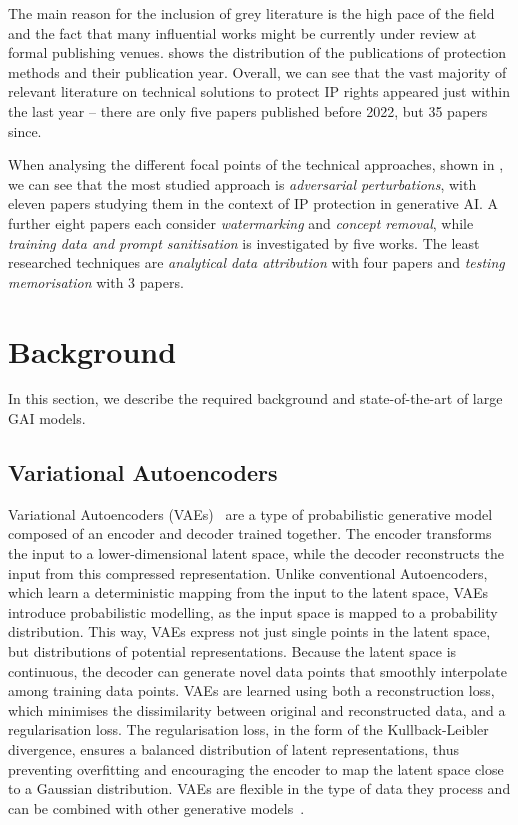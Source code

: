\documentclass[conference,table]{IEEEtran}
\begin{document}
The main reason for the inclusion of grey literature is the high pace of the field and the fact that many influential works might be currently under review at formal publishing venues.
 shows the distribution of the publications of protection methods and their publication year. 
Overall, we can see that the vast majority of relevant literature on technical solutions to protect IP rights appeared just within the last year -- there are only five papers published before 2022, but 35 papers since.

When analysing the different focal points of the technical approaches, shown in , we can see that the most studied approach is \textit{adversarial perturbations}, with eleven papers studying them in the context of IP protection in generative AI.
A further eight papers each consider \textit{watermarking} and \textit{concept removal}, while \textit{training data and prompt sanitisation} is investigated by five works.
The least researched techniques are \textit{analytical data attribution} with four papers and \textit{testing memorisation} with 3 papers.

\section{Background}\label{sec:background}
In this section, we describe the required background and state-of-the-art of large GAI models.

\subsection{Variational Autoencoders}
Variational Autoencoders (VAEs)~\cite{kingma_auto-encoding_2022} are a type of probabilistic generative model composed of an encoder and decoder trained together. The encoder transforms the input to a lower-dimensional latent space, while the decoder reconstructs the input from this compressed representation. Unlike conventional Autoencoders, which learn a deterministic mapping from the input to the latent space, VAEs introduce probabilistic modelling, as the input space is mapped to a probability distribution. This way, VAEs express not just single points in the latent space, but distributions of potential representations. Because the latent space is continuous, the decoder can generate novel data points that smoothly interpolate among training data points. 
VAEs are learned using both a reconstruction loss, which minimises the dissimilarity between original and reconstructed data, and a regularisation loss. The regularisation loss, in the form of the Kullback-Leibler divergence, ensures a balanced distribution of latent representations, thus preventing overfitting and encouraging the encoder to map the latent space close to a Gaussian distribution. 
VAEs are flexible in the type of data they process and can be combined with other generative models~\cite{bao_cvae-gan_2017, pandey_diffusevae_2022}.
\end{document}
